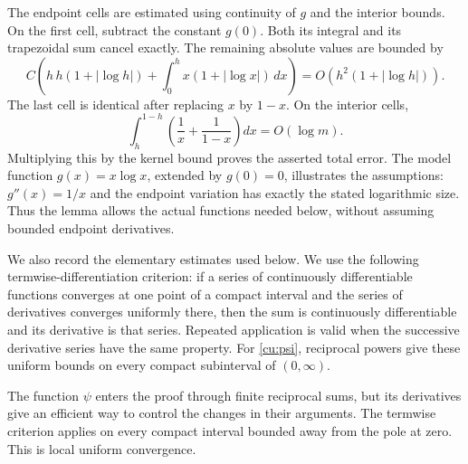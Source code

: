 The endpoint cells are estimated using continuity of $g$ and the
interior bounds. On the first cell, subtract the constant
$g(0)$. Both its integral and its trapezoidal sum cancel exactly.
The remaining absolute values are bounded by
\[
 C\left(h\,h(1+|\log h|)
       +\int_0^h x(1+|\log x|)\,dx\right)
       =O(h^2(1+|\log h|)).
\]
The last cell is identical after replacing $x$ by $1-x$.
On the interior cells,
\[
 \int_h^{1-h}\left(\frac1x+\frac1{1-x}\right)dx
                 =O(\log m).
\]
Multiplying this by the kernel bound proves the asserted total error.
The model function $g(x)=x\log x$, extended by $g(0)=0$, illustrates
the assumptions: $g''(x)=1/x$ and the endpoint variation has exactly
the stated logarithmic size. Thus the lemma allows the actual
functions needed below, without assuming bounded endpoint derivatives.

We also record the elementary estimates used below.
We use the following termwise-differentiation criterion: if a series of
continuously differentiable functions converges at one point of a compact
interval and the series of derivatives converges uniformly there, then
the sum is continuously differentiable and its derivative is that series.
Repeated application is valid when the successive derivative series have
the same property. For \eqref{cu:psi}, reciprocal powers give these uniform
bounds on every compact subinterval of $(0,\infty)$.


The function $\psi$ enters the proof through finite reciprocal
sums, but its derivatives give an efficient way to control the
changes in their arguments. The termwise criterion applies on every compact interval bounded away
from the pole at zero. This is local uniform convergence.

